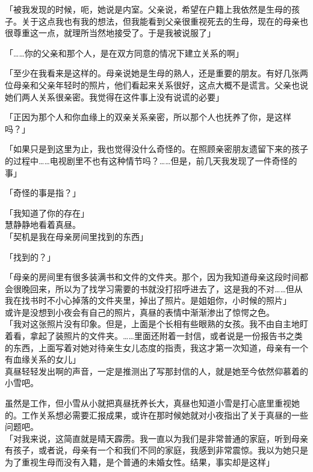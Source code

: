 「被我发现的时候，呃，她说是内室。父亲说，希望在户籍上我依然是生母的孩子。关于这点我也有我的想法，但我能看到父亲很重视死去的生母，现在的母亲也很尊重这一点，就理所当然地接受了。于是我被说服了」

「……你的父亲和那个人，是在双方同意的情况下建立关系的啊」

「至少在我看来是这样的。母亲说她是生母的熟人，还是重要的朋友。有好几张两位母亲和父亲年轻时的照片，他们看起来关系很好，这点大概不是谎言。父亲也说她们两人关系很亲密。我觉得在这件事上没有说谎的必要」

「正因为那个人和你血缘上的双亲关系亲密，所以那个人也抚养了你，是这样吗？」

「如果只是到这里为止，我也觉得没什么奇怪的。在照顾亲密朋友遗留下来的孩子的过程中……电视剧里不也有这种情节吗？……但是，前几天我发现了一件奇怪的事」

「奇怪的事是指？」

「我知道了你的存在」\\

慧静静地看着真昼。\\

「契机是我在母亲房间里找到的东西」

「找到的？」

「母亲的房间里有很多装满书和文件的文件夹。那个，因为我知道母亲这段时间都会很晚回来，所以为了找学习需要的书就没打招呼进去了，这是我的不对……但从我在找书时不小心掉落的文件夹里，掉出了照片。是姐姐你，小时候的照片」\\

或许是没想到小夜会有自己的照片，真昼的表情中渐渐渗出了惊愕之色。\\

「我对这张照片没有印象。但是，上面是个长相有些眼熟的女孩。我不由自主地盯着看，拿起了装照片的文件夹。……里面还附着一封信，或者说是一份报告书之类的东西，上面写着对她对待亲生女儿态度的指责，我这才第一次知道，母亲有一个有血缘关系的女儿」\\

真昼轻轻发出啊的声音，一定是推测出了写那封信的人，就是她至今依然仰慕着的小雪吧。

虽然是工作，但小雪从小就把真昼抚养长大，真昼也知道小雪是打心底里重视她的。工作关系想必需要汇报成果，或许在那时候她就对小夜指出了关于真昼的一些问题吧。\\

「对我来说，这简直就是晴天霹雳。我一直以为我们是非常普通的家庭，听到母亲有孩子，或者说，母亲有一个和我们不同的家庭，我感到非常震惊。我以为她只是为了重视生母而没有入籍，是个普通的未婚女性。结果，事实却是这样」\\

